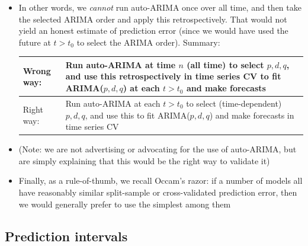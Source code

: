 \documentclass{article}
\begin{document}
\begin{itemize}
\item In other words, we \emph{cannot} run auto-ARIMA once over all time, and
  then take the selected ARIMA order and apply this retrospectively. That would
  not yield an honest estimate of prediction error (since we would have used the 
  future at $t > t_0$ to select the ARIMA order). Summary:

\begin{center}
\begin{tabular}{|l|l|}
\hline
Wrong way: & 
\parbox[c]{0.77\textwidth}{ \smallskip
Run auto-ARIMA at time $n$ (all time) to select $p,d,q$, and use this 
retrospectively in time series CV to fit ARIMA($p,d,q$) at each $t > t_0$ and
make forecasts \smallskip}  
\\ \hline
Right way: & 
\parbox[c]{0.77\textwidth}{ \smallskip
Run auto-ARIMA at each $t > t_0$ to select (time-dependent) $p,d,q$, and use
this to fit ARIMA($p,d,q$) and make forecasts in time series CV \smallskip} 
\\ \hline
\end{tabular}  
\end{center}

\item (Note: we are not advertising or advocating for the use of auto-ARIMA, but
  are simply explaining that this would be the right way to validate it) 

\item Finally, as a rule-of-thumb, we recall Occam's razor: if a number of
  models all have reasonably similar split-sample or cross-validated prediction
  error, then we would generally prefer to use the simplest among them 
\end{itemize}

\subsection{Prediction intervals}
\end{document}
